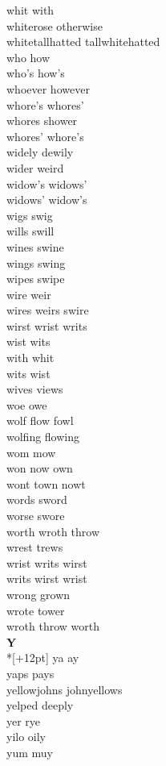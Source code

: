 whit with\\
whiterose otherwise\\
whitetallhatted tallwhitehatted\\
who how\\
who's how's\\
whoever however\\
whore's whores'\\
whores shower\\
whores' whore's\\
widely dewily\\
wider weird\\
widow's widows'\\
widows' widow's\\
wigs swig\\
wills swill\\
wines swine\\
wings swing\\
wipes swipe\\
wire weir\\
wires weirs swire\\
wirst wrist writs\\
wist wits\\
with whit\\
wits wist\\
wives views\\
woe owe\\
wolf flow fowl\\
wolfing flowing\\
wom mow\\
won now own\\
wont town nowt\\
words sword\\
worse swore\\
worth wroth throw\\
wrest trews\\
wrist writs wirst\\
writs wirst wrist\\
wrong grown\\
wrote tower\\
wroth throw worth\\

\vspace{14pt}
\noindent\textbf{\Large Y}\\*[+12pt]
ya ay\\
yaps pays\\
yellowjohns johnyellows\\
yelped deeply\\
yer rye\\
yilo oily\\
yum muy\\
